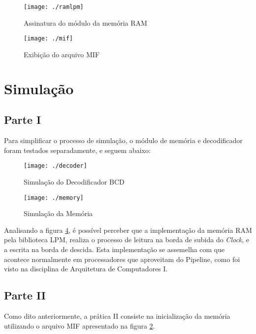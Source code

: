 \documentclass[12pt, a4paper]{article}
\begin{document}
    \vspace{\baselineskip}
    
    \begin{figure}[H]
    	\centering
    	\texttt{[image: ./ramlpm]}
    	\caption{Assinatura do módulo da memória RAM}
    	\label{fig: ramlpm}
    \end{figure}

	\begin{figure}[H]
		\centering
		\texttt{[image: ./mif]}
		\caption{Exibição do arquivo MIF}
		\label{fig: mif}
	\end{figure}

	\section{Simulação}
	
	\subsection{Parte I}
	
	\par Para simplificar o processo de simulação, o módulo de memória e decodificador foram testados separadamente, e seguem abaixo:
	
	\begin{figure}[H]
		\centering
		\texttt{[image: ./decoder]}
		\caption{Simulação do Decodificador BCD}
		\label{fig: decoder}
	\end{figure}

	\begin{figure}[H]
		\centering
		\texttt{[image: ./memory]}
		\caption{Simulação da Memória}
		\label{fig: memory}
	\end{figure}

	\par Analisando a figura \ref{fig: memory}, é possível perceber que a implementação da memória RAM pela biblioteca LPM, realiza o processo de leitura na borda de subida do \textit{Clock}, e a escrita na borda de descida. Esta implementação se assemelha com que acontece normalmente em processadores que aproveitam do Pipeline, como foi visto na disciplina de Arquitetura de Computadores I.
	
	\subsection{Parte II}
	
	\par Como dito anteriormente, a prática II consiste na inicialização da memória utilizando o arquivo MIF apresentado na figura \ref{fig: mif}.
	
\end{document}
